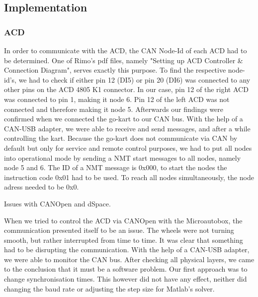 \subsection{Implementation}


\subsubsection{ACD}


In order to communicate with the ACD, the CAN Node-Id of each ACD had to be determined. One of Rimo's pdf files, namely "Setting up ACD Controller \& Connection Diagram", serves exactly this purpose. 
To find the respective node-id's, we had to check if either pin 12 (DI5) or pin 20 (DI6) was connected to any other pins on the ACD 4805 K1 connector. In our case, pin 12 of the right ACD was connected to pin 1, making it node 6. Pin 12 of the left ACD was not connected and therefore making it node 5. Afterwards our findings were confirmed when we connected the go-kart to our CAN bus. With the help of a CAN-USB adapter, we were able to receive and send messages, and after a while controlling the kart.
Because the go-kart does not communicate via CAN by default but only for service and remote control purposes, we had to put all nodes into operational mode by sending a NMT start messages to all nodes, namely node 5 and 6.
The ID of a NMT message is 0x000, to start the nodes the instruction code 0x01 had to be used. To reach all nodes simultaneously, the node adress needed to be 0x0. 

Issues with CANOpen and dSpace. 

When we tried to control the ACD via CANOpen with the Microautobox, the communication presented itself to be an issue. The wheels were not turning smooth, but rather interrupted from time to time. It was clear that something had to be disrupting the communication.
With the help of a CAN-USB adapter, we were able to monitor the CAN bus. After checking all physical layers, we came to the conclusion that it must be a software problem. Our first approach was to change synchronisation times. This however did not have any effect, neither did changing the baud rate or adjusting the step size for Matlab's solver.



